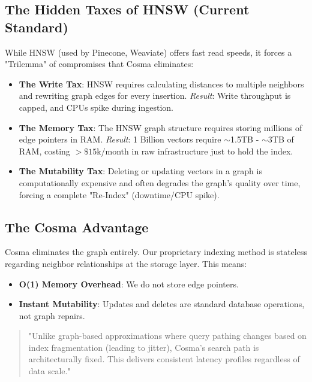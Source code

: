 \subsection{The Hidden Taxes of HNSW (Current Standard)}

While HNSW (used by Pinecone, Weaviate) offers fast read speeds, it forces a "Trilemma" of compromises that Cosma eliminates:

\begin{itemize}
    \item \textbf{The Write Tax}: HNSW requires calculating distances to multiple neighbors and rewriting graph edges for every insertion.
    \textit{Result}: Write throughput is capped, and CPUs spike during ingestion.
    
    \item \textbf{The Memory Tax}: The HNSW graph structure requires storing millions of edge pointers in RAM.
    \textit{Result}: 1 Billion vectors require $\sim$1.5TB - $\sim$3TB of RAM, costing $>\$15$k/month in raw infrastructure just to hold the index.
    
    \item \textbf{The Mutability Tax}: Deleting or updating vectors in a graph is computationally expensive and often degrades the graph's quality over time, forcing a complete "Re-Index" (downtime/CPU spike).
\end{itemize}

\subsection{The Cosma Advantage}

Cosma eliminates the graph entirely. Our proprietary indexing method is stateless regarding neighbor relationships at the storage layer. This means:

\begin{itemize}
    \item \textbf{O(1) Memory Overhead}: We do not store edge pointers.
    \item \textbf{Instant Mutability}: Updates and deletes are standard database operations, not graph repairs.
\end{itemize}

\begin{quote}
"Unlike graph-based approximations where query pathing changes based on index fragmentation (leading to jitter), Cosma's search path is architecturally fixed. This delivers consistent latency profiles regardless of data scale."
\end{quote}
